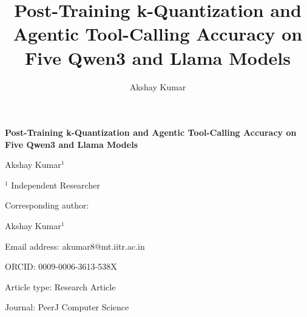 \documentclass[12pt,letterpaper]{article}
\title{Post-Training k-Quantization and Agentic Tool-Calling Accuracy on Five Qwen3 and Llama Models}
\author{Akshay Kumar}
\date{}
\begin{document}
\raggedright

\begin{titlepage}
\vspace*{2cm}
{\Large\bfseries Post-Training k-Quantization and Agentic Tool-Calling Accuracy on Five Qwen3 and Llama Models\par}
\vspace{1.5cm}
{\large Akshay Kumar$^{1}$\par}
\vspace{0.5cm}
$^{1}$ Independent Researcher\par
\vspace{1cm}
Corresponding author:\par
Akshay Kumar$^{1}$\par
Email address: akumar8@mt.iitr.ac.in\par
ORCID: 0009-0006-3613-538X\par
\vspace{1cm}
Article type: Research Article\par
Journal: PeerJ Computer Science\par
\vfill
\end{titlepage}

\linenumbers
\maketitle
\end{document}
